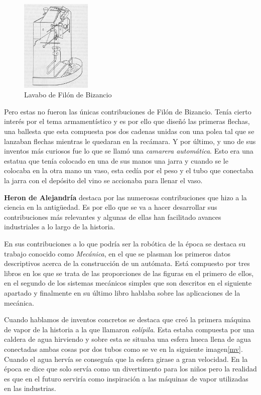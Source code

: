 \begin{figure}[H]
\begin{center}
  \includegraphics[width=0.3\textwidth]{./EtapaPrimeriza/imagenes/lavabo.jpg}
  \caption{Lavabo de Filón de Bizancio}
  \label{lavabo}
\end{center}
\end{figure}

Pero estas no fueron las únicas contribuciones de Filón de Bizancio. Tenía cierto interés por el tema armamentístico y es por ello que diseñó las primeras flechas, una ballesta que esta compuesta pos dos cadenas unidas con una polea tal que se lanzaban flechas mientras le quedaran en la recámara. Y por último, y uno de sus inventos más curiosos fue lo que se llamó una \textit{camarera automática}. Esto era una estatua que tenía colocado en una de sus manos una jarra y cuando se le colocaba en la otra mano un vaso, esta cedía por el peso y el tubo que conectaba la jarra con el depósito del vino se accionaba para llenar el vaso. 



\textbf{Heron de Alejandría} destaca por las numerosas contribuciones que hizo a la ciencia en la antigüedad. Es por ello que se va a hacer desarrollar sus contribuciones más relevantes y algunas de ellas han facilitado avances industriales a lo largo de la historia.

En sus contribuciones a lo que podría ser la robótica de la época se destaca su trabajo conocido como \textit{Mecánica}, en el que se plasman los primeros datos descriptivos acerca de la construcción de un autómata. Está compuesto por tres libros en los que se trata de las proporciones de las figuras en el primero de ellos, en el segundo de los sistemas mecánicos simples que son descritos en el siguiente apartado y finalmente en su último libro hablaba sobre las aplicaciones de la mecánica.

Cuando hablamos de inventos concretos se destaca que creó la primera máquina de vapor de la historia a la que llamaron \textit{eolípila}. Esta estaba compuesta por una caldera de agua hirviendo y sobre esta se situaba una esfera hueca llena de agua conectadas ambas cosas por dos tubos como se ve en la siguiente imagen\ref{mv}. Cuando el agua hervía se conseguía que la esfera girase a gran velocidad. En la época se dice que solo servía como un divertimento para los niños pero la realidad es que en el futuro serviría como inspiración a las máquinas de vapor utilizadas en las industrias.

